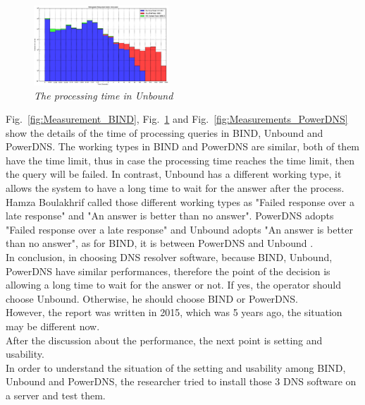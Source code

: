 \documentclass[conference]{IEEEtran}
\begin{document}
\begin{figure}[hbt!]  
    \centering
    \includegraphics[width=0.45\textwidth]{figure/Measurement-Unbound.jpg}
    \caption{\em The processing time in Unbound \cite{DNS_resolver_performance_measurements} \label{fig:Measurement_Unbound}}
\end{figure}


Fig.~\ref{fig:Measurement_BIND}, Fig.~\ref{fig:Measurement_Unbound} and Fig.~\ref{fig:Measurements_PowerDNS} show the details of the time of processing queries in BIND, Unbound and PowerDNS. The working types in BIND and PowerDNS are similar, both of them have the time limit, thus in case the processing time reaches the time limit, then the query will be failed. In contrast, Unbound has a different working type, it allows the system to have a long time to wait for the answer after the process. Hamza Boulakhrif called those different working types as "Failed response over a late response" and "An answer is better than no answer". PowerDNS adopts "Failed response over a late response" and Unbound adopts "An answer is better than no answer", as for BIND, it is between PowerDNS and Unbound \cite{DNS_resolver_performance_measurements}.
\\

In conclusion, in choosing DNS resolver software, because BIND, Unbound, PowerDNS have similar performances, therefore the point of the decision is allowing a long time to wait for the answer or not. If yes, the operator should choose Unbound. Otherwise, he should choose BIND or PowerDNS.
\\

However, the report was written in 2015, which was 5 years ago, the situation may be different now.
\\

After the discussion about the performance, the next point is setting and usability.
\\

In order to understand the situation of the setting and usability among BIND, Unbound and PowerDNS, the researcher tried to install those 3 DNS software on a server and test them.
\\
\end{document}
